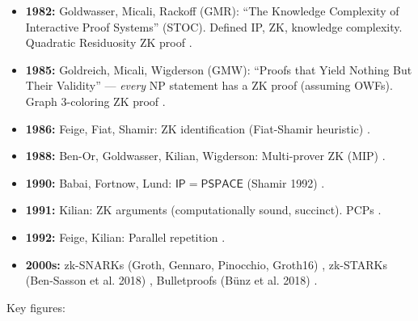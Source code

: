 \begin{itemize}
\item \textbf{1982:} Goldwasser, Micali, Rackoff (GMR): ``The Knowledge Complexity of Interactive Proof Systems'' (STOC). Defined IP, ZK, knowledge complexity. Quadratic Residuosity ZK proof \cite{GoldwasserMicaliRackoff1985}.
\item \textbf{1985:} Goldreich, Micali, Wigderson (GMW): ``Proofs that Yield Nothing But Their Validity'' --- \emph{every} NP statement has a ZK proof (assuming OWFs). Graph 3-coloring ZK proof \cite{GoldreichMicaliWigderson1986}.
\item \textbf{1986:} Feige, Fiat, Shamir: ZK identification (Fiat-Shamir heuristic) \cite{FeigeFiatShamir1987,FiatShamir1986}.
\item \textbf{1988:} Ben-Or, Goldwasser, Kilian, Wigderson: Multi-prover ZK (MIP) \cite{benor1983,GoldwasserMicaliRackoff1985}.
\item \textbf{1990:} Babai, Fortnow, Lund: $\mathsf{IP} = \mathsf{PSPACE}$ (Shamir 1992) \cite{BabaiFortnowLund1991,Shamir1992}.
\item \textbf{1991:} Kilian: ZK arguments (computationally sound, succinct). PCPs \cite{Kilian1992,goldreichmicaliwigderson1991}.
\item \textbf{1992:} Feige, Kilian: Parallel repetition \cite{Feige1998}.
\item \textbf{2000s:} zk-SNARKs (Groth, Gennaro, Pinocchio, Groth16) \cite{Groth2010}, zk-STARKs (Ben-Sasson et al. 2018) \cite{BenSassonEtAl2016,BenSassonEtAl2019}, Bulletproofs (B\"unz et al. 2018) \cite{Bunz2018}.
\end{itemize}

Key figures:

